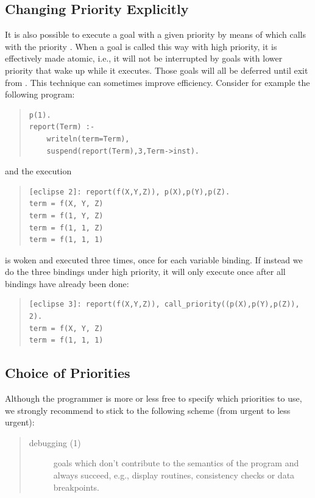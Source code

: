{\subsection{Changing Priority Explicitly}
It is also possible to execute a goal with a given priority
by means of
which calls  with the priority .
When a goal is called this way with high priority, it is effectively
made atomic, i.e., it will not be interrupted by goals with lower priority
that wake up while it executes.
Those goals will all be deferred until exit from
.
This technique can sometimes improve efficiency.
Consider for example the following program:
\begin{quote}
\begin{verbatim}
p(1).
report(Term) :-
    writeln(term=Term),
    suspend(report(Term),3,Term->inst).
\end{verbatim}
\end{quote}
and the execution
\begin{quote}
\begin{verbatim}
[eclipse 2]: report(f(X,Y,Z)), p(X),p(Y),p(Z).
term = f(X, Y, Z)
term = f(1, Y, Z)
term = f(1, 1, Z)
term = f(1, 1, 1)
\end{verbatim}
\end{quote}
 is woken and executed three times, once for each variable
binding.
If instead we do the three bindings under high priority, it will only
execute once after all bindings have already been done:
\begin{quote}
\begin{verbatim}
[eclipse 3]: report(f(X,Y,Z)), call_priority((p(X),p(Y),p(Z)), 2).
term = f(X, Y, Z)
term = f(1, 1, 1)
\end{verbatim}
\end{quote}


\subsection{Choice of Priorities}
Although the programmer is more or less free to specify
which priorities to use, we strongly recommend
to stick to the following scheme (from urgent to less urgent):
\begin{quote}
\begin{description}
\item [debugging (1)]  goals which don't contribute to the semantics
of the program and always succeed, e.g., display routines, consistency
checks or data breakpoints.


\end{description}
\end{quote}}

